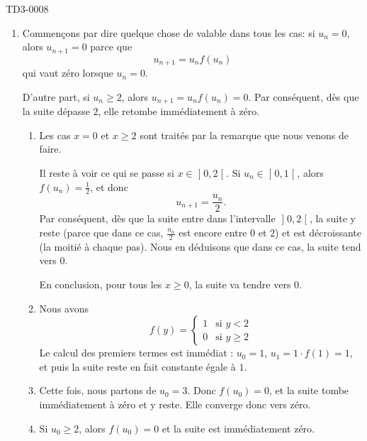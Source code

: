 
\begin{corrige}{TD3-0008}

	\begin{enumerate}
		\item
			Commençons par dire quelque chose de valable dans tous les cas: si $u_n=0$, alors $u_{n+1}=0$ parce que
			\begin{equation}
				u_{n+1}=u_nf(u_n)
			\end{equation}
			qui vaut zéro lorsque $u_n=0$.

			D'autre part, si $u_n\geq 2$, alors $u_{n+1}=u_nf(u_n)=0$. Par conséquent, dès que la suite dépasse $2$, elle retombe immédiatement à zéro.
			\begin{enumerate}
				\item
					Les cas $x=0$ et $x\geq 2$ sont traités par la remarque que nous venons de faire.

			Il reste à voir ce qui se passe si $x\in\mathopen] 0 , 2 \mathclose[$. Si $u_n\in\mathopen] 0 , 1 \mathclose[$, alors $f(u_n)=\frac{ 1 }{2}$, et donc
			\begin{equation}
				u_{n+1}=\frac{ u_n }{ 2 }.
			\end{equation}
			Par conséquent, dès que la suite entre dans l'intervalle $\mathopen] 0 , 2 \mathclose[$, la suite y reste (parce que dans ce cas, $\frac{ u_n }{2}$ est encore entre $0$ et $2$) et est décroissante (la moitié à chaque pas). Nous en déduisons que dans ce cas, la suite tend vers $0$.

			En conclusion, pour tous les $x\geq 0$, la suite va tendre vers $0$.

				\item
					Nous avons
					\begin{equation}
						f(y)=\begin{cases}
							1	&	\text{si }y<2\\
							0	&	 \text{si }y\geq 2
						\end{cases}
					\end{equation}
					Le calcul des premiers termes est immédiat : $u_0=1$, $u_1=1\cdot f(1)=1$, et puis la suite reste en fait constante égale à $1$.
				\item
					Cette fois, nous partons de $u_0=3$. Donc $f(u_0)=0$, et la suite tombe immédiatement à zéro et y reste. Elle converge donc vers zéro.
				\item
					Si $u_0\geq 2$, alors $f(u_0)=0$ et la suite est immédiatement zéro.


\end{enumerate}
\end{enumerate}
\end{corrige}
